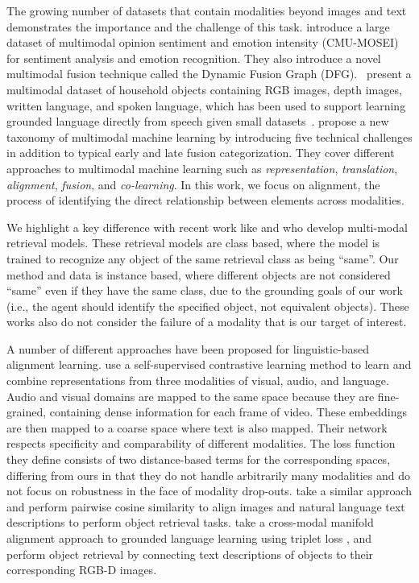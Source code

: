 \documentclass[10pt]{article} %
\begin{document}
The growing number of datasets that contain modalities beyond images and text demonstrates the importance and the challenge of this task. \citet{bagher-zadeh-etal-2018-multimodal} introduce a large dataset of multimodal opinion sentiment and emotion intensity (CMU-MOSEI) for sentiment analysis and emotion recognition. They also introduce a novel multimodal fusion technique called the Dynamic Fusion Graph (DFG).~\citet{GoLD_UMBC} present a multimodal dataset of household objects containing RGB images, depth images, written language, and spoken language, which has been used to support learning grounded language directly from speech given small datasets~\cite{KebeAAAI2022}. 
\citet{baltrusaitisMultimodalMachineLearning2019} propose a new taxonomy of multimodal machine learning by introducing five technical challenges in addition to typical early and late fusion categorization. They cover different approaches to multimodal machine learning such as \textit{representation}, \textit{translation}, \textit{alignment}, \textit{fusion}, and \textit{co-learning}. In this work, we focus on alignment, the process of identifying the direct relationship between elements across modalities.

We highlight a key difference with recent work like \citet{10.1145/3397271.3401232} and \citet{10.1145/3331184.3331213} who develop multi-modal retrieval models. These retrieval models are class based, where the model is trained to recognize any object of the same retrieval class as being ``same''. Our method and data is instance based, where different objects are not considered ``same'' even if they have the same class, due to the grounding goals of our work (i.e., the agent should identify the specified object, not equivalent objects). These works also do not consider the failure of a modality that is our target of interest. 

A number of different approaches have been proposed for linguistic-based alignment learning. \citet{alayrac2020self} use a self-supervised contrastive learning method to learn and combine representations from three modalities of visual, audio, and language. Audio and visual domains are mapped to the same space because they are fine-grained, containing dense information for each frame of video. These embeddings are then mapped to a coarse space where text is also mapped. Their network respects specificity and comparability of different modalities. The loss function they define consists of two distance-based terms for the corresponding spaces, differing from ours in that they do not handle arbitrarily many modalities and do not focus on robustness in the face of modality drop-outs. \citet{Nguyen-RSS-20} take a similar approach and perform pairwise cosine similarity to align images and natural language text descriptions to perform object retrieval tasks. \citet{triplet_loss_2021_CVPR} take a cross-modal manifold alignment approach to grounded language learning using triplet loss \cite{Chechik:2010:LSO:1756006.1756042}, and perform object retrieval by connecting text descriptions of objects to their corresponding RGB-D images.
\end{document}

